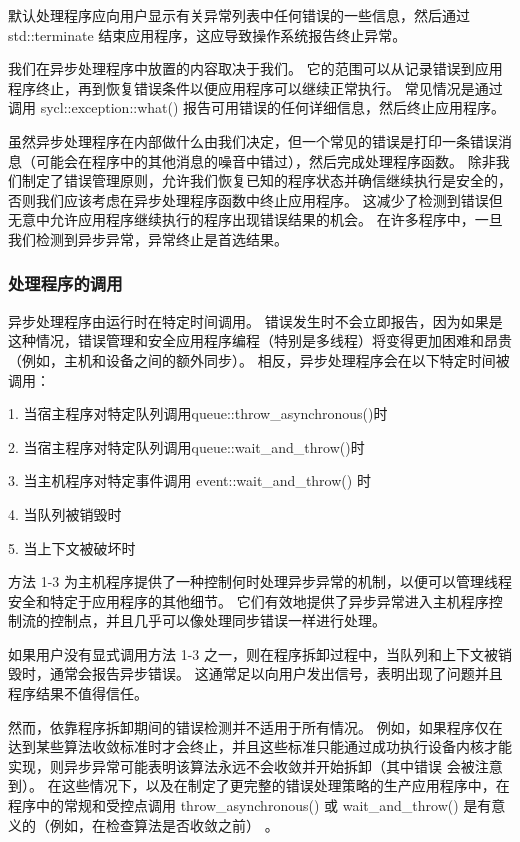 默认处理程序应向用户显示有关异常列表中任何错误的一些信息，然后通过 std::terminate 结束应用程序，这应导致操作系统报告终止异常。

我们在异步处理程序中放置的内容取决于我们。 它的范围可以从记录错误到应用程序终止，再到恢复错误条件以便应用程序可以继续正常执行。 常见情况是通过调用 sycl::exception::what() 报告可用错误的任何详细信息，然后终止应用程序。

虽然异步处理程序在内部做什么由我们决定，但一个常见的错误是打印一条错误消息（可能会在程序中的其他消息的噪音中错过），然后完成处理程序函数。 除非我们制定了错误管理原则，允许我们恢复已知的程序状态并确信继续执行是安全的，否则我们应该考虑在异步处理程序函数中终止应用程序。 这减少了检测到错误但无意中允许应用程序继续执行的程序出现错误结果的机会。 在许多程序中，一旦我们检测到异步异常，异常终止是首选结果。

\subsubsection{处理程序的调用}
异步处理程序由运行时在特定时间调用。 错误发生时不会立即报告，因为如果是这种情况，错误管理和安全应用程序编程（特别是多线程）将变得更加困难和昂贵（例如，主机和设备之间的额外同步）。 相反，异步处理程序会在以下特定时间被调用：

1. 当宿主程序对特定队列调用queue::throw\_asynchronous()时

2. 当宿主程序对特定队列调用queue::wait\_and\_throw()时

3. 当主机程序对特定事件调用 event::wait\_and\_throw() 时

4. 当队列被销毁时

5. 当上下文被破坏时

方法 1-3 为主机程序提供了一种控制何时处理异步异常的机制，以便可以管理线程安全和特定于应用程序的其他细节。 它们有效地提供了异步异常进入主机程序控制流的控制点，并且几乎可以像处理同步错误一样进行处理。

如果用户没有显式调用方法 1-3 之一，则在程序拆卸过程中，当队列和上下文被销毁时，通常会报告异步错误。 这通常足以向用户发出信号，表明出现了问题并且程序结果不值得信任。

然而，依靠程序拆卸期间的错误检测并不适用于所有情况。 例如，如果程序仅在达到某些算法收敛标准时才会终止，并且这些标准只能通过成功执行设备内核才能实现，则异步异常可能表明该算法永远不会收敛并开始拆卸（其中错误 会被注意到）。 在这些情况下，以及在制定了更完整的错误处理策略的生产应用程序中，在程序中的常规和受控点调用 throw\_asynchronous() 或 wait\_and\_throw() 是有意义的（例如，在检查算法是否收敛之前） 。

